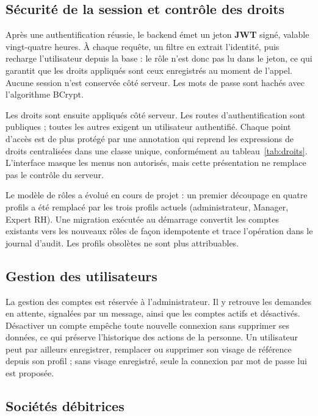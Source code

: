 \subsection{Sécurité de la session et contrôle des droits}

Après une authentification réussie, le backend émet un jeton \textbf{JWT} signé, valable vingt-quatre heures. À chaque requête, un filtre en extrait l'identité, puis recharge l'utilisateur depuis la base : le rôle n'est donc pas lu dans le jeton, ce qui garantit que les droits appliqués sont ceux enregistrés au moment de l'appel. Aucune session n'est conservée côté serveur. Les mots de passe sont hachés avec l'algorithme BCrypt.

Les droits sont ensuite appliqués côté serveur. Les routes d'authentification sont publiques ; toutes les autres exigent un utilisateur authentifié. Chaque point d'accès est de plus protégé par une annotation qui reprend les expressions de droits centralisées dans une classe unique, conformément au tableau~\ref{tab:droits}. L'interface masque les menus non autorisés, mais cette présentation ne remplace pas le contrôle du serveur.

Le modèle de rôles a évolué en cours de projet : un premier découpage en quatre profils a été remplacé par les trois profils actuels (administrateur, Manager, Expert RH). Une migration exécutée au démarrage convertit les comptes existants vers les nouveaux rôles de façon idempotente et trace l'opération dans le journal d'audit. Les profils obsolètes ne sont plus attribuables.

\subsection{Gestion des utilisateurs}

La gestion des comptes est réservée à l'administrateur. Il y retrouve les demandes en attente, signalées par un message, ainsi que les comptes actifs et désactivés. Désactiver un compte empêche toute nouvelle connexion sans supprimer ses données, ce qui préserve l'historique des actions de la personne. Un utilisateur peut par ailleurs enregistrer, remplacer ou supprimer son visage de référence depuis son profil ; sans visage enregistré, seule la connexion par mot de passe lui est proposée.

\subsection{Sociétés débitrices}

